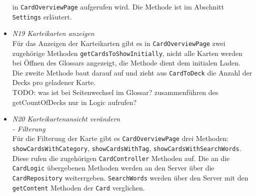 \documentclass[fontsize=12pt,paper=A4,twoside]{scrartcl}
\begin{document}
\begin{itemize}
    in \texttt{CardOverviewPage} aufgerufen wird. Die Methode ist im Abschnitt \texttt{Settings} erläutert.
    \item \textit{N19 Karteikarten anzeigen}\\ Für das Anzeigen der Karteikarten gibt es in \texttt{CardOverviewPage} zwei zugehörige Methoden
    \texttt{getCardsToShowInitially}, nicht alle Karten werden bei Öffnen
    des Glossars angezeigt, die Methode dient dem initialen Laden. Die zweite Methode baut darauf auf und zieht aus \texttt{CardToDeck} die Anzahl der
    Decks pro geladener Karte. \\
    TODO: was ist bei Seitenwechsel im Glossar? zusammenführen des getCountOfDecks nur in Logic aufrufen?
    \item \textit{N20 Karteikartenansicht verändern\\- Filterung}\\ 
    Für die Filterung der Karte gibt es \texttt{CardOverviewPage} drei Methoden:
    \texttt{showCardsWithCategory}, \texttt{showCardsWithTag}, \texttt{showCardsWithSearchWords}. Diese rufen die zugehörigen \texttt{CardController} Methoden auf. Die an 
    die \texttt{CardLogic} übergebenen Methoden werden an den Server über die \texttt{CardRepository} weiterrgeben. \texttt{SearchWords} werden über 
    den Server mit den \texttt{getContent} Methoden der \texttt{Card} verglichen.
    \end{itemize}
\end{document}
